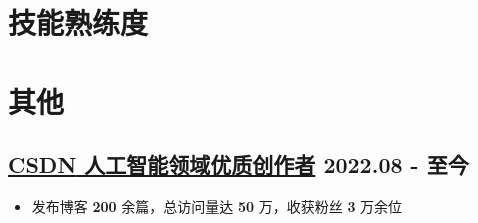 \documentclass{resume}
\begin{document}
\section[技能熟练度]{ \textbf{\color{mainColor}技能熟练度}}

\begin{minipage}{0.28\textwidth}
 \vspace{-2pt}
\end{minipage}
\hfill
\begin{minipage}{0.28\textwidth}
 \vspace{-2pt}
\end{minipage}
\hfill
\begin{minipage}{0.28\textwidth}
 \vspace{-2pt}
\end{minipage}
\section[其他]{ \textbf{\color{mainColor}其他}}

\subsection[CSDN 人工智能领域优质创作者]{\href{https://marquis.blog.csdn.net/}{\textbf{CSDN} \quad 人工智能领域优质创作者} \hfill {\small 2022.08 - 至今}}

\begin{itemize}
    \item 发布博客 \textbf{200} 余篇，总访问量达 \textbf{50} 万，收获粉丝 \textbf{3} 万余位
\end{itemize}
\end{document}

